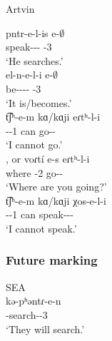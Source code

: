 \begin{exe}
	\ex Artvin\label{sent:Artvin:morpho:verb:impfMore}
	\begin{xlist}
		\ex \gll pntr-e-l-is e-$\emptyset$ \\
		speak-{\thgloss}-{\infgloss}-{\impfcvb} {\aux}-3{\sg} \\
		\trans `He searches.'\\
		\ex \gll el-n-e-l-i e-$\emptyset$ \\
		be-{\vx}-{\thgloss}-{\infgloss}-{\impfcvb} {\aux}-3{\sg} \\
		\trans `It is/becomes.'\\
		\ex \gll t͡ʃʰ-e-m kɑ/kɑji eɾtʰ-l-i \\
		{\neggloss}-{\aux}-1{\sg} can go-{\infgloss}-{\impfcvb} \\
		\trans `I cannot go.'\\ 
		, or 
		\ex \gll voɾt\'i e-s eɾtʰ-l-i \\
		where {\aux}-2{\sg} go-{\infgloss}-{\impfcvb} \\
		\trans `Where are you going?'\\
		\ex \gll t͡ʃʰ-e-m kɑ/kɑji χos-e-l-i \\
		{\neggloss}-{\aux}-1{\sg} can speak-{\thgloss}-{\infgloss}-{\impfcvb} \\
		\trans `I cannot speak.'\\ 
		
	\end{xlist}
\end{exe}

\subsubsection{Future marking}


\begin{exe}
	\ex SEA \label{sent:Artvin:morpho:verb:fut:SEA} \\
	\gll kə-pʰəntɾ-e-n \\
	{\fut}-search-{\thgloss}-3{\pl} \\
	\trans `They will search.' \\
\end{exe}

